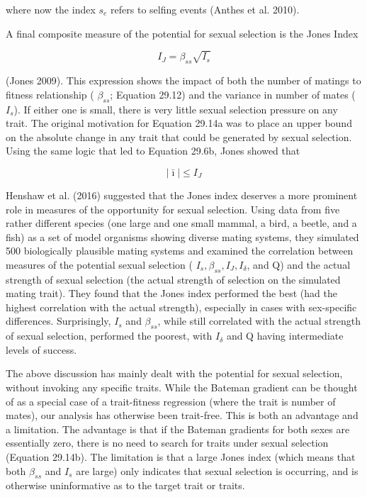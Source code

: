 \documentclass{article}
\begin{document}
where now the index  $ s_{e} $ refers to selfing events (Anthes et al. 2010).

A final composite measure of the potential for sexual selection is the Jones Index

\begin{equation}
I_{J}=\beta_{s s}\sqrt{I_{s}}
\tag{29.14a}
\label{eq:29_14a}
\end{equation}

(Jones 2009). This expression shows the impact of both the number of matings to fitness relationship ( $ \beta_{ss} $; Equation 29.12) and the variance in number of mates ( $ I_{s} $). If either one is small, there is very little sexual selection pressure on any trait. The original motivation for Equation 29.14a was to place an upper bound on the absolute change in any trait that could be generated by sexual selection. Using the same logic that led to Equation 29.6b, Jones showed that

\begin{equation}
\left|\bar{\imath}\right|\leq I_{J}
\tag{29.14b}
\label{eq:29_14b}
\end{equation}

Henshaw et al. (2016) suggested that the Jones index deserves a more prominent role in measures of the opportunity for sexual selection. Using data from five rather different species (one large and one small mammal, a bird, a beetle, and a fish) as a set of model organisms showing diverse mating systems, they simulated 500 biologically plausible mating systems and examined the correlation between measures of the potential sexual selection ( $ I_{s}, \beta_{ss}, I_{J}, I_{\delta} $, and Q) and the actual strength of sexual selection (the actual strength of selection on the simulated mating trait). They found that the Jones index performed the best (had the highest correlation with the actual strength), especially in cases with sex-specific differences. Surprisingly,  $ I_{s} $ and  $ \beta_{ss} $, while still correlated with the actual strength of sexual selection, performed the poorest, with  $ I_{\delta} $ and Q having intermediate levels of success.

The above discussion has mainly dealt with the potential for sexual selection, without invoking any specific traits. While the Bateman gradient can be thought of as a special case of a trait-fitness regression (where the trait is number of mates), our analysis has otherwise been trait-free. This is both an advantage and a limitation. The advantage is that if the Bateman gradients for both sexes are essentially zero, there is no need to search for traits under sexual selection (Equation 29.14b). The limitation is that a large Jones index (which means that both  $ \beta_{ss} $ and  $ I_{s} $ are large) only indicates that sexual selection is occurring, and is otherwise uninformative as to the target trait or traits.
\end{document}
